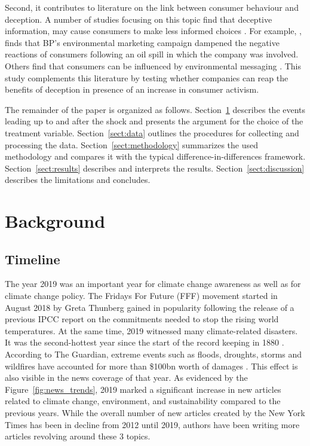 \documentclass[12pt]{article}
\begin{document}
Second, it contributes to literature on the link between consumer behaviour and deception. A number of studies focusing on this topic find that deceptive information, may cause consumers to make less informed choices \parencite{raoDemandHealthyProducts2017,bronnenbergPharmacistsBuyBayer2015}. For example, \textcite{barrageAdvertisingEnvironmentalStewardship2020}, finds that BP's environmental marketing campaign dampened the negative reactions of consumers following an oil spill in which the company was involved. Others find that consumers can be influenced by environmental messaging \parencite{parguelCanEvokingNature2015,schmuckMisleadingConsumersGreen2018,nyilasyPerceivedGreenwashingInteractive2014}. This study complements this literature by testing whether companies can reap the benefits of deception in presence of an increase in consumer activism.

The remainder of the paper is organized as follows. Section~\ref{sect:background} describes the events leading up to and after the shock and presents the argument for the choice of the treatment variable. Section~\ref{sect:data} outlines the procedures for collecting and processing the data. Section~\ref{sect:methodology} summarizes the used methodology and compares it with the typical difference-in-differences framework. Section~\ref{sect:results} describes and interprets the results. Section~\ref{sect:discussion} describes the limitations and concludes.

\section{Background}\label{sect:background}

\subsection{Timeline} 

The year 2019 was an important year for climate change awareness as well as for climate change policy. The Fridays For Future (FFF) movement started in August 2018 by Greta Thunberg gained in popularity following the release of a previous IPCC report on the commitments needed to stop the rising world temperatures. At the same time, 2019 witnessed many climate-related disasters. It was the second-hottest year since the start of the record keeping in 1880 \parencite{noaa2019global}. According to The Guardian, extreme events such as floods, droughts, storms and wildfires have accounted for more than \$100bn worth of damages \parencite{harvey2019climate}. This effect is also visible in the news coverage of that year. As evidenced by the Figure~\ref{fig:news_trends}, 2019 marked a significant increase in new articles related to climate change, environment, and sustainability compared to the previous years. While the overall number of new articles created by the New York Times has been in decline from 2012 until 2019, authors have been writing more articles revolving around these 3 topics.
\end{document}
